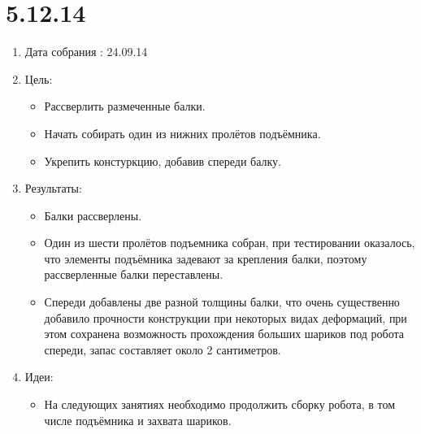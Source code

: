 \documentclass[12pt]{article}
\begin{document}
  \section{5.12.14}
  \begin{enumerate}
    \item Дата собрания : 24.09.14
  	\item Цель:
  	\begin{itemize}
  	  \item Рассверлить размеченные балки.
  	  \item Начать собирать один из нижних пролётов подъёмника. 
  	  \item Укрепить констуркцию, добавив спереди балку.
  	\end{itemize}
  	\item Результаты:
  	\begin{itemize}
  	  \item Балки рассверлены.
  	  \item Один из шести пролётов подъемника собран, при тестировании оказалось, что элементы подъёмника задевают за крепления балки, поэтому рассверленные балки переставлены.
  	  \item Спереди добавлены две разной толщины балки, что очень существенно добавило прочности конструкции при некоторых видах деформаций, при этом сохранена возможность прохождения больших шариков под робота спереди, запас составляет около 2 сантиметров. 
  	\end{itemize} 
  	\item Идеи:
  	\begin{itemize}
  	  \item На следующих занятиях необходимо продолжить сборку робота, в том числе подъёмника и захвата шариков.
  	\end{itemize}
  \end{enumerate}
\end{document}
